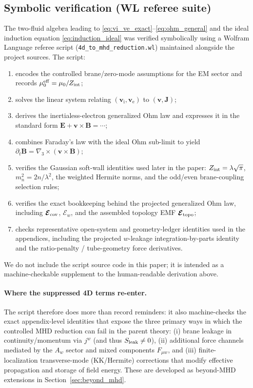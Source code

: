 \documentclass[11pt]{article}
\newcommand{\gradthree}{\nabla_3}
\newcommand{\ion}{\mathrm{i}}
\newcommand{\ele}{\mathrm{e}}
\newcommand{\E}{\mathbf{E}}
\newcommand{\B}{\mathbf{B}}
\newcommand{\Jb}{\mathbf{J}}
\newcommand{\Sleak}{S_{\rm leak}}
\newcommand{\Zint}{Z_{\rm int}}
\begin{document}
\subsection{Symbolic verification (WL referee suite)}
\label{sec:wl_verification}

The two-fluid algebra leading to \eqref{eq:vi_ve_exact}--\eqref{eq:ohm_general} and the
ideal induction equation \eqref{eq:induction_ideal} was verified symbolically using a
Wolfram Language referee script (\texttt{4d\_to\_mhd\_reduction.wl}) maintained alongside
the project sources. The script:
\begin{enumerate}[leftmargin=1.6em]
\item encodes the controlled brane/zero-mode assumptions for the EM sector and records
\(\mu_0^{\rm eff}=\mu_0/\Zint\);
\item solves the linear system relating \((\mathbf{v}_\ion,\mathbf{v}_\ele)\) to
\((\mathbf{v},\Jb)\);
\item derives the inertialess-electron generalized Ohm law and expresses it in the
standard form \(\E+\mathbf{v}\times\B=\cdots\);
\item combines Faraday's law with the ideal Ohm sub-limit to yield
\(\partial_t\B=\gradthree\times(\mathbf{v}\times\B)\);
\item verifies the Gaussian soft-wall identities used later in the paper:
\(Z_{\rm int}=\lambda\sqrt{\pi}\), \(m_n^2=2n/\lambda^2\), the weighted Hermite norms,
and the odd/even brane-coupling selection rules;
\item verifies the exact bookkeeping behind the projected generalized Ohm law,
including \(\boldsymbol{\mathcal{E}}_{\rm cov}\), \(\boldsymbol{\mathcal{E}}_w\),
and the assembled topology EMF \(\boldsymbol{\mathcal{E}}_{\rm topo}\);
\item checks representative open-system and geometry-ledger identities used in the
appendices, including the projected \(w\)-leakage integration-by-parts identity and
the ratio-penalty / tube-geometry force derivatives.
\end{enumerate}
We do not include the script source code in this paper; it is intended as a
machine-checkable supplement to the human-readable derivation above.

\paragraph{Where the suppressed 4D terms re-enter.}
The script therefore does more than record reminders: it also machine-checks the
exact appendix-level identities that expose the three primary ways in which the
controlled MHD reduction can fail in the parent theory:
(i) brane leakage in continuity/momentum via \(j^w\) (and thus \(\Sleak\neq 0\)),
(ii) additional force channels mediated by the \(A_w\) sector and mixed components
\(F_{\mu w}\), and (iii) finite-localization transverse-mode (KK/Hermite) corrections that
modify effective propagation and storage of field energy. These are developed as beyond-MHD
extensions in Section~\ref{sec:beyond_mhd}.
\end{document}
